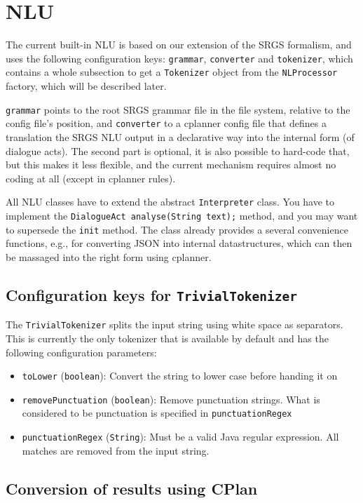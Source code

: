 \section{NLU}
The current built-in NLU is based on our extension of the SRGS
formalism, and uses the following configuration keys:
\texttt{grammar}, \texttt{converter} and \texttt{tokenizer}, which
contains a whole subsection to get a \texttt{Tokenizer} object from
the \texttt{NLProcessor} factory, which will be described later.

\texttt{grammar} points to the root SRGS grammar file in the file
system, relative to the config file's position, and \texttt{converter}
to a cplanner config file that defines a translation the SRGS NLU output
in a declarative way into the internal form (of dialogue acts). The
second part is optional, it is also possible to hard-code that, but
this makes it less flexible, and the current mechanism requires almost
no coding at all (except in cplanner rules).

All NLU classes have to extend the abstract \texttt{Interpreter}
class. You have to implement the
\verb|DialogueAct analyse(String text);| method, and you may want to
supersede the \texttt{init} method. The class already provides a
several convenience functions, e.g., for converting JSON into internal
datastructures, which can then be massaged into the right form using cplanner.

\subsection{Configuration keys for \texttt{TrivialTokenizer}}
The \texttt{TrivialTokenizer} splits the input string using white space as
separators. This is currently the only tokenizer that is available by default
and has the following configuration parameters:
\begin{itemize}
\item \texttt{toLower} (\texttt{boolean}): Convert the string to lower case
  before handing it on
\item \texttt{removePunctuation} (\texttt{boolean}): Remove punctuation
  strings. What is considered to be punctuation is specified in
  \texttt{punctuationRegex}
\item \texttt{punctuationRegex} (\texttt{String}): Must be a valid Java regular
  expression. All matches are removed from the input string.
\end{itemize}

\subsection{Conversion of results using CPlan}

